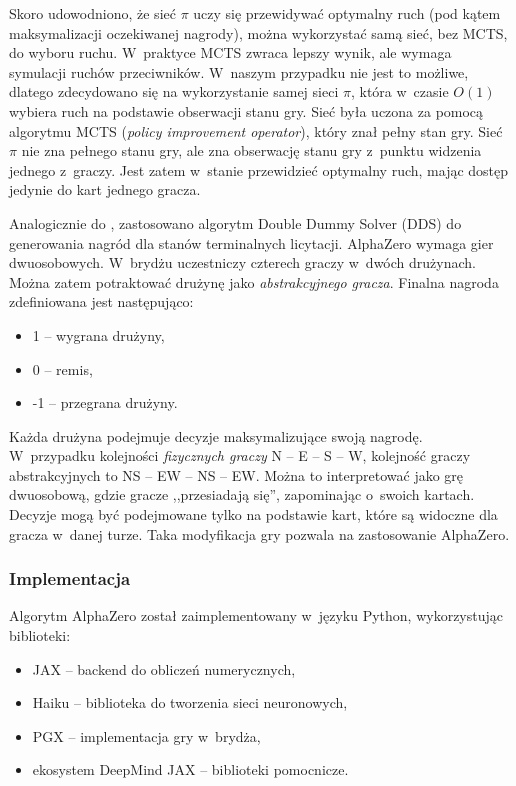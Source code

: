 Skoro udowodniono, że sieć $\pi$ uczy się przewidywać
optymalny ruch (pod kątem maksymalizacji oczekiwanej nagrody),
można wykorzystać samą sieć, bez MCTS, do wyboru ruchu.
W~praktyce MCTS zwraca lepszy wynik, ale wymaga
symulacji ruchów przeciwników.
W~naszym przypadku nie jest to możliwe, dlatego
zdecydowano się na wykorzystanie samej sieci $\pi$,
która w~czasie $O(1)$ wybiera ruch na podstawie obserwacji stanu gry.
Sieć była uczona za pomocą algorytmu MCTS (\textit{policy improvement operator}),
który znał pełny stan gry.
Sieć $\pi$ nie zna pełnego stanu gry, ale zna obserwację stanu gry
z~punktu widzenia jednego z~graczy.
Jest zatem w~stanie przewidzieć optymalny ruch,
mając dostęp jedynie do kart jednego gracza.

Analogicznie do \cite{rong19,gong20,tian20,lockhart20}, zastosowano
algorytm Double Dummy Solver (DDS) \cite{DDS} do generowania
nagród dla stanów terminalnych licytacji.
AlphaZero wymaga gier dwuosobowych.
W~brydżu uczestniczy czterech graczy w~dwóch drużynach.
Można zatem potraktować drużynę jako \textit{abstrakcyjnego gracza}.
Finalna nagroda zdefiniowana jest następująco:
\begin{itemize}
    \item 1 -- wygrana drużyny,
    \item 0 -- remis,
    \item -1 -- przegrana drużyny.
\end{itemize}
Każda drużyna podejmuje decyzje maksymalizujące swoją nagrodę.
W~przypadku kolejności \textit{fizycznych graczy}
N -- E -- S -- W, kolejność graczy abstrakcyjnych to
NS -- EW -- NS -- EW.
Można to interpretować jako grę dwuosobową,
gdzie gracze ,,przesiadają się'', zapominając o~swoich kartach.
Decyzje mogą być podejmowane tylko na podstawie kart, które
są widoczne dla gracza w~danej turze.
Taka modyfikacja gry pozwala na zastosowanie AlphaZero.

\subsubsection{Implementacja}

Algorytm AlphaZero został zaimplementowany w~języku Python,
wykorzystując biblioteki:
\begin{itemize}
    \item JAX \cite{JAX} -- backend do obliczeń numerycznych,
    \item Haiku \cite{Haiku} -- biblioteka do tworzenia sieci neuronowych,
    \item PGX \cite{PGX} -- implementacja gry w~brydża,
    \item ekosystem DeepMind JAX \cite{JAXEcosystem} -- biblioteki pomocnicze.
\end{itemize}

